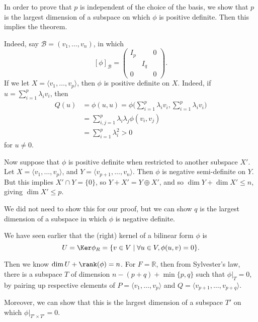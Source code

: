 \documentclass[12pt]{article}
\begin{document}
\begin{proofbox}
	In order to prove that $p$ is independent of the choice of the basis, we show that $p$ is the largest dimension of a subspace on which $\phi$ is positive definite. Then this implies the theorem.

	Indeed, say $\mathcal{B} = (v_1, \ldots, v_n)$, in which
	\[
		[\phi]_{\mathcal{B}} =
		\begin{pmatrix}
			I_p & & 0\\
			    & I_q & \\
			0 & & 0
		\end{pmatrix}.
	\]
	If we let $X = \langle v_1, \ldots, v_p \rangle$, then $\phi$ is positive definite on $X$. Indeed, if $u = \sum_{i = 1}^{p} \lambda_i v_i$, then
	\begin{align*}
		Q(u) &= \phi(u, u) = \phi \Biggl( \sum_{i = 1}^{p} \lambda_i v_i, \sum_{i = 1}^{p} \lambda_i v_i \Biggr) \\
		     &= \sum_{i,j = 1}^{p} \lambda_i \lambda_j \phi(v_i, v_j) \\
		     &= \sum_{i = 1}^{p} \lambda_i^2 > 0
	\end{align*}
	for $u \neq 0$.

	Now suppose that $\phi$ is positive definite when restricted to another subspace $X'$. Let $X = \langle v_1, \ldots, v_p \rangle$, and $Y = \langle v_{p+1}, \ldots, v_n \rangle$. Then $\phi$ is negative semi-definite on $Y$. But this implies $X' \cap Y = \{0\}$, so $Y + X' = Y \oplus X'$, and so $\dim Y + \dim X' \leq n$, giving $\dim X' \leq p$.
\end{proofbox}

\begin{remark}
	We did not need to show this for our proof, but we can show $q$ is the largest dimension of a subspace in which $\phi$ is negative definite.
\end{remark}

We have seen earlier that the (right) kernel of a bilinear form $\phi$ is
\[
	U = \Ker \phi_R = \{v \in V \mid \forall u \in V, \phi(u, v) = 0\}
.\]

Then we know $\dim U + \rank(\phi) = n$. For $F = \mathbb{R}$, then from Sylvester's law, there is a subspace $T$ of dimension $n - (p+q) + \min \{p, q\}$ such that $\phi|_T = 0$, by pairing up respective elements of $P = \langle v_1, \ldots, v_p \rangle$ and $Q = \langle v_{p+1}, \ldots, v_{p+q} \rangle$.

Moreover, we can show that this is the largest dimension of a subspace $T'$ on which $\phi|_{T' \times T'} = 0$.
\end{document}
